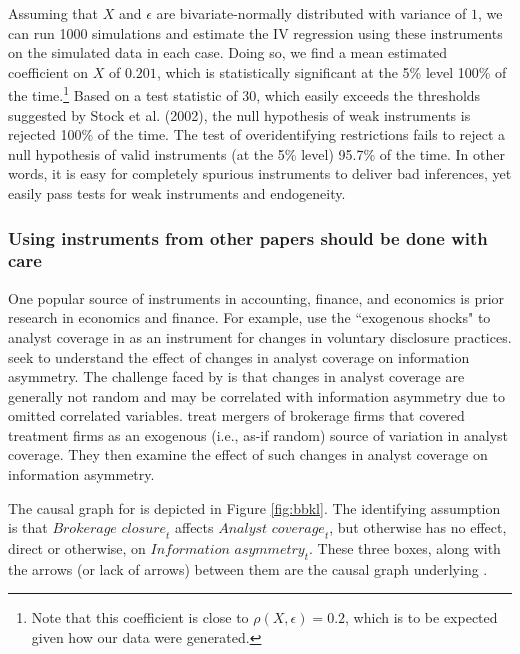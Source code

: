 \documentclass[11pt]{amsart}
\begin{document}
Assuming that $X$ and $\epsilon$ are bivariate-normally distributed with variance of $1$, we can run 1000 simulations and  estimate the IV regression using these instruments on the simulated data in each case. Doing so, we find a mean estimated coefficient on $X$ of $0.201$, which is statistically significant at the 5\% level 100\% of the time.\footnote{Note that this coefficient is close to $\rho(X, \epsilon) = 0.2$, which is to be expected given how our data were generated.} Based on a test statistic of 30, which easily exceeds the thresholds suggested by Stock et al. (2002), the null hypothesis of weak instruments is rejected 100\% of the time. 
The test of overidentifying restrictions fails to reject a null hypothesis of valid instruments (at the 5\% level) 95.7\% of the time.
In other words, it is easy for completely spurious instruments to deliver bad inferences, yet easily pass tests for weak instruments and endogeneity.

\subsubsection{Using instruments from other papers should be done with care}
One popular source of instruments in accounting, finance, and economics is prior research in economics and finance.
For example, \citet{Balakrishnan:2014js} use the ``exogenous shocks" to analyst coverage in \citet{Kelly:2012ih} as an instrument for changes in voluntary disclosure practices. 
\citet{Kelly:2012ih} seek to understand the effect of changes in analyst coverage on information asymmetry. 
The challenge faced by \citet{Kelly:2012ih} is that changes in analyst coverage are generally not random and may be correlated with information asymmetry due to omitted correlated variables.
\citet{Kelly:2012ih} treat mergers of brokerage firms that covered treatment firms as an exogenous (i.e., as-if random) source of variation in analyst coverage.%
They then examine the effect of such changes in analyst coverage on information asymmetry.

The causal graph for \citet{Kelly:2012ih} is depicted in Figure \ref{fig:bbkl}.
The identifying assumption is that $\textit{Brokerage closure}_t$ affects $\textit{Analyst coverage}_t$, but otherwise has no effect, direct or otherwise, on $\textit{Information asymmetry}_t$.
These three boxes, along with the arrows (or lack of arrows) between them are the causal graph underlying \citet{Kelly:2012ih}.
\end{document}
